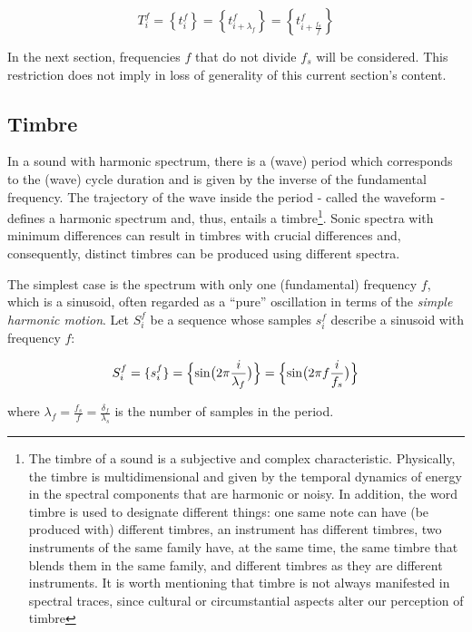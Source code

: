\begin{equation}\label{periodicidade}
     T^f_i=\left\{ t_i^f \right\}=\left\{ t^f_{i+\lambda_{f}}  \right\}= \left\{ t^f_{i+\frac{f_a}{f}} \right\}
\end{equation}

In the next section, frequencies $f$ that do not divide $f_s$ will be considered. This restriction does not imply in loss of generality of this current section's content.

\subsection{Timbre}
In a sound with harmonic spectrum, there is a (wave) period which corresponds to the (wave) cycle duration and is given by the inverse of the fundamental frequency. The trajectory of the wave inside the period - called the waveform - defines a harmonic spectrum and, thus, entails a timbre\footnote{The timbre of a sound is a subjective and complex characteristic. Physically, the timbre is multidimensional and given by the temporal dynamics of energy in the spectral components that are harmonic or noisy. In addition, the word timbre is used to designate different things: one same note can have (be produced with) different timbres, an instrument has different timbres, two instruments of the same family have, at the same time, the same timbre that blends them in the same family, and different timbres as they are different instruments. It is worth mentioning that timbre is not always manifested in spectral traces, since cultural or circumstantial aspects alter our perception of timbre}. Sonic spectra with minimum differences can result in timbres with crucial differences and, consequently, distinct timbres can be produced using different spectra\cite{Roederer}.

The simplest case is the spectrum with only one (fundamental) frequency $f$, which is a sinusoid, often regarded as a ``pure'' oscillation in terms of the \emph{simple harmonic motion}. Let $S_i^f$ be a sequence whose samples $s_i^f$ describe a sinusoid with frequency $f$:

\begin{equation}\label{sinusoid}
     S^f_i=\{ s^f_i \}=\Bigl\{ \sin\bigl(2\pi \frac{i}{\lambda_f} \bigr)  \Bigr\} = \Bigl\{ \sin\bigl(2\pi f \frac{i}{f_s}\bigr)  \Bigr\} 
\end{equation}

\noindent where $\lambda_f=\frac{f_s}{f}=\frac{\delta_f}{\lambda_s}$ is the number of samples in the period.

